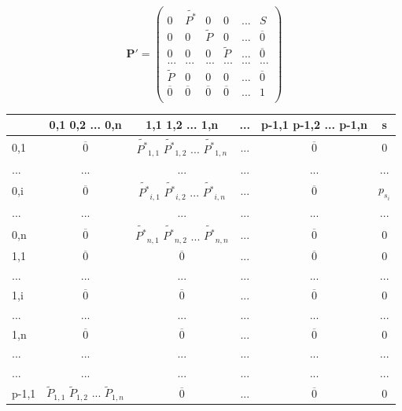 	\begin{displaymath}
		\mathbf{P'} =
		\left( \begin{array}{ccccc|c}
		0 & \tilde{P^*} & 0 & 0 & ... & S \\
		0 & 0 & \tilde{P} & 0 & ... & \overline 0 \\
		0 & 0 & 0 & \tilde{P} & ... & \overline 0 \\
		... & ... & ... & ... & ... & ... \\
		\tilde{P} & 0 & 0 & 0 & ... & \overline 0 \\
		\hline
		\overline 0 & \overline 0 & \overline 0 & \overline 0 & ... & 1 \\
		\end{array} \right)
	\end{displaymath}
	
	\begin{table}[H]
		\begin{tabular}{l || c | c | c | c | c}
			& 0,1 0,2 ... 0,n & 1,1 1,2 ... 1,n & ... & p-1,1 p-1,2 ... p-1,n & s \\
			\hline \hline
			0,1 & $\overline 0$ & $\tilde{P^*}_{1,1}$ $\tilde{P^*}_{1,2}$ ... $\tilde{P^*}_{1,n}$ & ... & $\overline 0$ & 0 \\
			... & ... & ... & ... & ... & ... \\
			0,i & $\overline 0$ & $\tilde{P^*}_{i,1}$ $\tilde{P^*}_{i,2}$ ... $\tilde{P^*}_{i,n}$ & ... & $\overline 0$ & $p_{s_i}$ \\
			... & ... & ... & ... & ... & ... \\
			0,n & $\overline 0$ & $\tilde{P^*}_{n,1}$ $\tilde{P^*}_{n,2}$ ... $\tilde{P^*}_{n,n}$ & ... & $\overline 0$ & 0 \\
			\hline \hline
			1,1 & $\overline 0$ & $\overline 0$ & ... & $\overline 0$ & 0 \\
			... & ... & ... & ... & ... & ... \\
			1,i & $\overline 0$ & $\overline 0$ & ... & $\overline 0$ & 0 \\
			... & ... & ... & ... & ... & ... \\
			1,n & $\overline 0$ & $\overline 0$ & ... & $\overline 0$ & 0 \\
			\hline \hline
			... & ... & ... & ... & ... & ... \\
			... & ... & ... & ... & ... & ... \\
			\hline \hline
			p-1,1  & $\tilde{P}_{1,1}$ $\tilde{P}_{1,2}$ ... $\tilde{P}_{1,n}$ & $\overline 0$ & ... & $\overline 0$ & 0 \\

\end{tabular}
\end{table}
